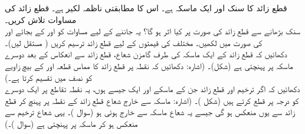  قطع زائد کا سنک   اور ایک ماسکہ  ہے۔ اس کا مطابقتی ناظمہ لکیر  ہے۔  قطع زائد کی مساوات تلاش کریں۔
\\
سنک بڑھانے سے قطع زائد کی صورت پر کیا اثر ہو گا؟ یہ جاننے کے لیے مساوات  کو  اور  کے بجائے  اور  کی صورت میں لکھیں۔ مختلف  کی قیمتوں کے لیے قطع زائد ترسیم کریں ( مستقل لیں)۔
\\
دکھائیں کہ قطع زائد کے ایک ماسکہ کی طرف گامزن شعاع، قطع زائد سے انعکاس کے بعد  دوسرے ماسکہ پر پہنچتی ہے (شکل)۔ (اشارہ: دکھائیں کہ نقطہ  پر قطع زائد کا مماس  قطعہ  اور  کے بیچ زاویے کو نصف میں تقسیم کرتا ہے۔)
\\
دکھائیں کہ اگر ترخیم اور قطع زائد جن کے   ماسکے  اور  ایک    جیسے ہوں، یہ نقطہ تقاطع پر  ایک دوسرے کو  درجہ پر قطع کرتے ہیں (شکل )۔ (اشارہ: ماسکہ  سے خارج شعاع قطع زائد کے نقطہ  پر پہنچ کر قطع زائد سے یوں منعکس ہو گی  جیسے یہ شعاع ماسکہ  سے خارج ہوئی ہو (سوال )۔ یہی شعاع ترخیم سے منعکس ہو کر ماسکہ  پر پہنچتی  ہے (سوال )۔)
